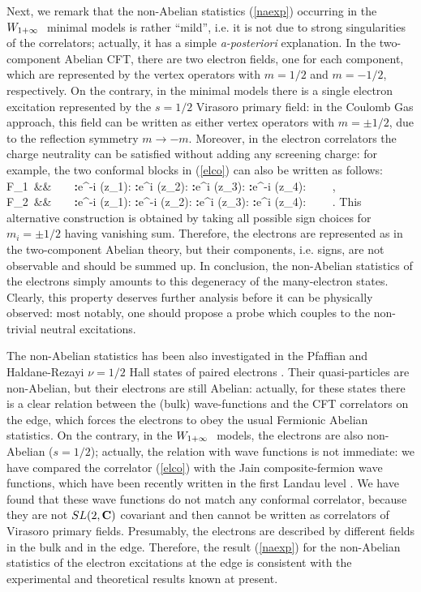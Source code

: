 Next, we remark that the non-Abelian statistics (\ref{naexp}) occurring
in the $W_{1+\infty}\ $ minimal models is rather ``mild'', i.e. it is not
due to strong singularities of the correlators; actually, it
has a simple {\it a-posteriori} explanation. 
In the two-component Abelian CFT, there are
two electron fields, one for each component, which are represented
by the vertex operators with $m=1/2$ and $m=-1/2$, respectively.
On the contrary, in the minimal
models there is a single electron excitation represented
by the $s=1/2$ Virasoro primary field: in the Coulomb Gas approach, this
field can be written as either vertex operators with 
$m=\pm 1/2$, due to the reflection symmetry $m \to - m$. 
Moreover, in the electron correlators the charge neutrality can be
satisfied without adding any screening charge: for example,
the two conformal blocks in (\ref{elco}) can also be written as follows:
\barr
{\cal F}_1\ &\propto&\ 
\langle\ \Omega\ \vert\ 
{\bf :}{\rm e}^{-{i \over{}} \varphi(z_1)}{\rm :}
{\bf :}{\rm e}^{{i\over{}} \varphi(z_2)}{\rm :}
{\bf :}{\rm e}^{{i\over\sqrt{2}} \varphi(z_3)}{\rm :}
{\bf :}{\rm e}^{-{i\over{}} \varphi(z_4)}{\rm :}
\ \vert\ \Omega\ \rangle\ , \nl
{\cal F}_2\ &\propto&\ 
\langle\ \Omega\ \vert\  
{\bf :}{\rm e}^{-{i \over{}} \varphi(z_1)}{\rm :}
{\bf :}{\rm e}^{-{i\over\sqrt{2}} \varphi(z_2)}{\rm :}
{\bf :}{\rm e}^{{i\over{}} \varphi(z_3)}{\rm :}
{\bf :}{\rm e}^{{i\over{}} \varphi(z_4)}{\rm :}
\ \vert\ \Omega\ \rangle\ .
\earr
This alternative construction is obtained
by taking all possible sign choices for $m_i=\pm 1/2$ having vanishing sum. 
Therefore, the electrons are represented as in the two-component
Abelian theory, but their components, i.e. signs, are not
observable and should be summed up.
In conclusion, the non-Abelian statistics of the electrons simply
amounts to this degeneracy of the many-electron states.
Clearly, this property deserves further analysis before it can be  
physically observed: most notably, one should propose a probe
which couples to the non-trivial neutral excitations.

The non-Abelian statistics has been also investigated in 
the Pfaffian and Haldane-Rezayi $\nu=1/2$ Hall states of 
paired electrons \cite{nonabe}. 
Their quasi-particles are non-Abelian,
but their electrons are still Abelian: actually, for these states 
there is a clear relation between the (bulk) wave-functions 
and the CFT correlators on the edge, which forces
the electrons to obey the usual Fermionic Abelian statistics.
On the contrary, in the $W_{1+\infty}\ $ models, the electrons are also
non-Abelian ($s=1/2$); actually, the  
relation with wave functions is not immediate: we have compared the 
correlator (\ref{elco}) with the Jain composite-fermion wave 
functions, which have been recently written in the first
Landau level \cite{jaka}. 
We have found that these wave functions do not match
any conformal correlator, because they are not $SL(2,{\bf C})$
covariant and then cannot be written as correlators of Virasoro primary fields. 
Presumably, the electrons are described by different fields 
in the bulk and in the edge. Therefore, the result (\ref{naexp})
for the non-Abelian
statistics of the electron excitations at the edge is consistent
with the experimental and theoretical results known at present. 

